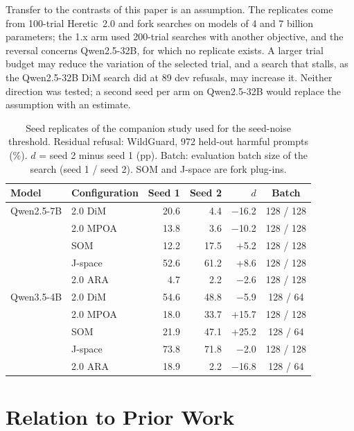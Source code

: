 Transfer to the contrasts of this paper is an assumption. The replicates come from 100-trial Heretic~2.0 and fork
searches on models of 4 and 7 billion parameters; the 1.x arm used 200-trial searches with another objective, and the
reversal concerns Qwen2.5-32B, for which no replicate exists. A larger trial budget may reduce the variation of the
selected trial, and a search that stalls, as the Qwen2.5-32B DiM search did at 89 dev refusals, may increase it.
Neither direction was tested; a second seed per arm on Qwen2.5-32B would replace the assumption with an estimate.

\begin{table}[!htbp]
\centering\small
\caption{Seed replicates of the companion study \cite{young2026harder} used for the seed-noise threshold. Residual
refusal: WildGuard, 972 held-out harmful prompts (\%). $d$ = seed 2 minus seed 1 (pp). Batch: evaluation batch size
of the search (seed 1 / seed 2). SOM and J-space are fork plug-ins.}
\label{tab:seedpairs}
\setlength{\tabcolsep}{5pt}
\begin{tabular}{@{}llrrrc@{}}
\toprule
Model & Configuration & Seed 1 & Seed 2 & $d$ & Batch \\
\midrule
Qwen2.5-7B & 2.0 DiM & 20.6 & 4.4 & $-$16.2 & 128 / 128 \\
 & 2.0 MPOA & 13.8 & 3.6 & $-$10.2 & 128 / 128 \\
 & SOM & 12.2 & 17.5 & +5.2 & 128 / 128 \\
 & J-space & 52.6 & 61.2 & +8.6 & 128 / 128 \\
 & 2.0 ARA & 4.7 & 2.2 & $-$2.6 & 128 / 128 \\
Qwen3.5-4B & 2.0 DiM & 54.6 & 48.8 & $-$5.9 & 128 / 64 \\
 & 2.0 MPOA & 18.0 & 33.7 & +15.7 & 128 / 128 \\
 & SOM & 21.9 & 47.1 & +25.2 & 128 / 64 \\
 & J-space & 73.8 & 71.8 & $-$2.0 & 128 / 128 \\
 & 2.0 ARA & 18.9 & 2.2 & $-$16.8 & 128 / 64 \\
\bottomrule
\end{tabular}
\end{table}

\section{Relation to Prior Work}
\label{app:versions}

